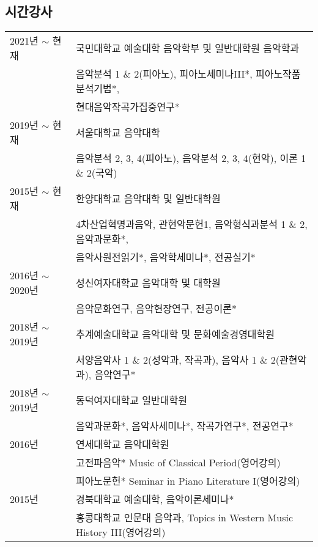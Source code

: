 \documentclass[dvipdfmx,a4paper]{article}
\begin{document}
  \subsection*{\small 시간강사}
  \hspace*{-0.25cm}
  \begin{tabular}{p{3.0cm} p{11.0cm}}
    2021년 $\sim$ 현재 & 국민대학교 예술대학 음악학부 및 일반대학원 음악학과\\
    & 음악분석 1 \& 2(피아노), 피아노세미나III*, 피아노작품분석기법*,\\
    & 현대음악작곡가집중연구*\\[1mm]
    
    2019년 $\sim$ 현재 & 서울대학교 음악대학\\
    & 음악분석 2, 3, 4(피아노), 음악분석 2, 3, 4(현악), 이론 1 \& 2(국악)\\[1mm]
    
    2015년 $\sim$ 현재 & 한양대학교 음악대학 및 일반대학원\\
    & 4차산업혁명과음악, 관현악문헌1, 음악형식과분석 1 \& 2, 음악과문화*,\\
    & 음악사원전읽기*, 음악학세미나*, 전공실기*\\[1mm]
    
    2016년 $\sim$ 2020년 & 성신여자대학교 음악대학 및 대학원\\
    & 음악문화연구, 음악현장연구, 전공이론*\\[1mm]
    
    2018년 $\sim$ 2019년 & 추계예술대학교 음악대학 및 문화예술경영대학원\\
    & 서양음악사 1 \& 2(성악과, 작곡과), 음악사 1 \& 2(관현악과), 음악연구*\\[1mm]
    
    2018년 $\sim$ 2019년 & 동덕여자대학교 일반대학원\\
    & 음악과문화*, 음악사세미나*, 작곡가연구*, 전공연구*\\[1mm]
    
    2016년 & 연세대학교 음악대학원\\
    & 고전파음악* Music of Classical Period(영어강의)\\
    & 피아노문헌* Seminar in Piano Literature I(영어강의)\\[1mm]
    
    2015년 & 경북대학교 예술대학, 음악이론세미나*\\[1mm]
    & 홍콩대학교 인문대 음악과, Topics in Western Music History III(영어강의)\\
%    
%    
%    
  \end{tabular}
  
\end{document}
